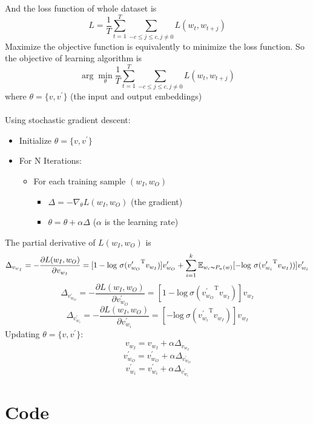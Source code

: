 \documentclass[12pt,a4paper,twoside]{book}
\begin{document}
	And the loss function of whole dataset is $$L=\frac{1}{T} \sum_{t=1}^{T} \sum_{-c\leq j\leq c, j\neq 0} L(w_t,w_{t+j})$$
	Maximize the objective function is equivalently to minimize the loss function. So the objective of learning algorithm is 
	$$\arg\min_\theta \frac{1}{T} \sum_{t=1}^{T} \sum_{-c\leq j\leq c, j\neq 0} L(w_t,w_{t+j})$$
	where $\theta = \{v,v^\prime\}$ (the input and output embeddings)\\
	\\
	Using stochastic gradient descent: 
	\begin{itemize}
	\item Initialize $\theta=\{v,v^\prime\}$
	\item For N Iterations:
		\begin{itemize}
		\item For each training sample $(w_I,w_O)$
		\begin{itemize}
		\item $\Delta = -\nabla_\theta L(w_I,w_O)$ (the gradient) 
		\item $\theta = \theta + \alpha\Delta$ ($\alpha$ is the learning rate)
		\end{itemize}
		\end{itemize}
	\end{itemize}
The partial derivative of $L(w_I,w_O)$ is
	$$\Delta_{v_{w_I}} = -\frac{\partial L(w_I,w_O)}{\partial v_{w_I}} = [1-\mathrm{log}\ \sigma({v^\prime_{w_O}}^{\mathrm{T}}v_{w_I})]v^\prime_{w_O}+\sum_{i=1}^k \mathbb{E}_{w_i\thicksim P_n(w)}[-\mathrm{log}\ \sigma({v^\prime_{w_i}}^{\mathrm{T}}v_{w_I}))]v^\prime_{w_i}$$
	$$\Delta_{v^\prime_{w_O}} = -\frac{\partial L(w_I,w_O)}{\partial v^\prime_{w_O}} = [1-\mathrm{log}\  \sigma({v^\prime_{w_O}}^{\mathrm{T}}v_{w_I})]v_{w_I}$$
	$$\Delta_{v^\prime_{w_i}} = -\frac{\partial L(w_I,w_O)}{\partial v^\prime_{w_i}} = [-\mathrm{log}\  \sigma({v^\prime_{w_i}}^{\mathrm{T}}v_{w_I})]v_{w_I}$$
Updating $\theta = \{v,v^\prime\} $:
    $$v_{w_I} = v_{w_I} + \alpha \Delta_{v_{w_I}}$$ 
	$$v^\prime_{w_O} = v^\prime_{w_O} + \alpha \Delta_{v^\prime_{w_O}}$$ 
	$$v^\prime_{w_i} = v^\prime_{w_i} + \alpha \Delta_{v^\prime_{w_i}}$$ 

\section{Code}
\end{document}

